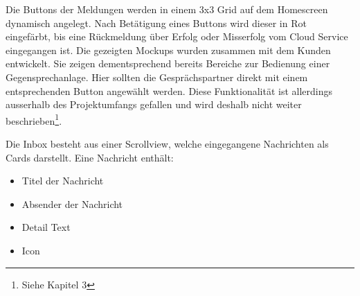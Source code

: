 Die Buttons der Meldungen werden in einem 3x3 Grid auf dem Homescreen dynamisch angelegt.
Nach Betätigung eines Buttons wird dieser in Rot eingefärbt, bis eine Rückmeldung über Erfolg oder Misserfolg vom Cloud Service eingegangen ist.
Die gezeigten Mockups wurden zusammen mit dem Kunden entwickelt.
Sie zeigen dementsprechend bereits Bereiche zur Bedienung einer Gegensprechanlage.
Hier sollten die Gesprächspartner direkt mit einem entsprechenden Button angewählt werden.
Diese Funktionalität ist allerdings ausserhalb des Projektumfangs gefallen und wird deshalb nicht weiter beschrieben\footnote{Siehe Kapitel 3}.

Die Inbox besteht aus einer Scrollview, welche eingegangene Nachrichten als Cards darstellt.
Eine Nachricht enthält:
\begin{itemize}
    \item Titel der Nachricht
    \item Absender der Nachricht
    \item Detail Text
    \item Icon
\end{itemize}

\clearpage

